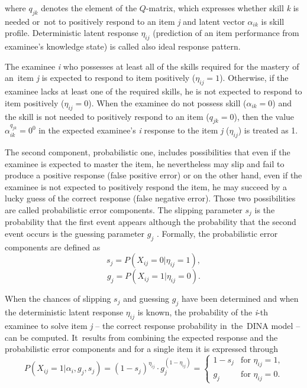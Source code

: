 \documentclass[english]{pwr_wmat_praca_dyplomowa}
\theoremstyle{plain}
\theoremstyle{definition}
\numberwithin{theorem}{chapter}
\begin{document}
\noindent where $q_{jk}$ denotes the element of the $Q$-matrix, which expresses whether skill \textit{k} is needed or~not to positively respond to an item \textit{j} and latent vector $\alpha_{ik}$ is skill profile. Deterministic latent response $\eta_{ij}$ (prediction of an item performance from examinee's knowledge state) is called also ideal response pattern. %

The examinee \textit{i} who possesses at least all of the skills required for the mastery of an~item \textit{j} is expected to respond to item positively ($\eta_{ij} = 1$). Otherwise, if the examinee lacks at least one of the required skills, he is not expected to respond to item positively ($\eta_{ij} = 0$). When the examinee do not possess skill ($\alpha_{ik} = 0$) and the skill is not needed to positively respond to an item ($q_{jk} = 0$), then the value $\alpha_{ik}^{q_{jk}} = 0^0$ in the expected examinee's \textit{i} response to the item \textit{j} ($\eta_{ij}$) is treated as 1.

The second component, probabilistic one, includes possibilities that even if the examinee is expected to master the item, he nevertheless may slip and fail to produce a positive response (false positive error) or on the other hand, even if the examinee is not expected to positively respond the item, he may succeed by a lucky guess of the correct response (false negative error). Those two possibilities are called probabilistic error components. The slipping parameter $s_j$ is the probability that the first event appears although the probability that the second event occurs is the guessing parameter $g_j$ \cite{de_la_torre_2011}. Formally, the probabilistic error components are defined as 
\begin{equation}
s_j = P(X_{ij} = 0 | \eta_{ij} = 1),
\end{equation}
\begin{equation}
g_j = P(X_{ij} = 1 | \eta_{ij} = 0).
\end{equation}

When the chances of slipping $s_j$ and guessing $g_j$ have been determined and when the deterministic latent response $\eta_{ij}$ is known, the probability of the \textit{i}-th examinee to solve item \textit{j} -- the correct response probability in~the~DINA model -- can be computed. It~results from combining the expected response and the probabilistic error components and for a single item it is expressed through
\begin{equation}
P(X_{ij} = 1 | \alpha_i, g_j, s_j) = (1-s_j)^{\eta_{ij}} \cdot g_j^{(1-\eta_{ij})} = \left\{ \begin{array}{ll}
1 - s_j & \textrm{for $\eta_{ij} = 1$,} \\
g_j & \textrm{for $\eta_{ij} = 0$.} 
\end{array}\right.
\end{equation}
\end{document}
